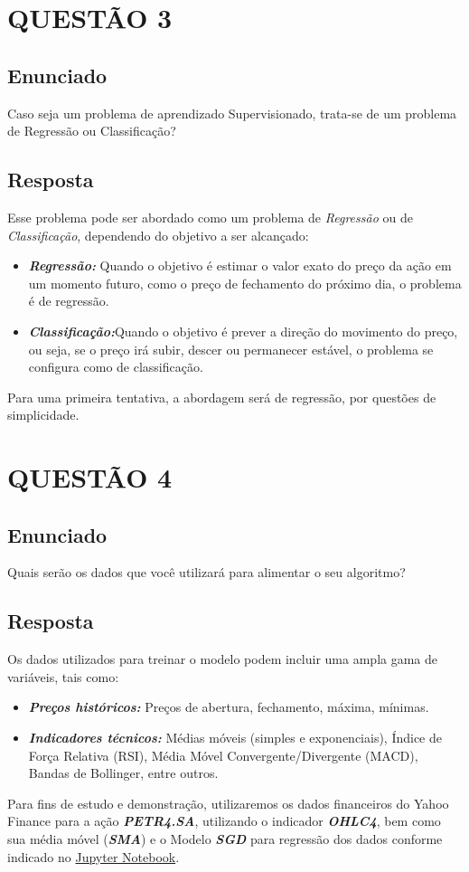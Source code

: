 \documentclass[a4paper, 12pt, onecolumn,singlespacing]{article}
\begin{document}
	\section{QUESTÃO 3}
	
	\subsection{Enunciado}
	Caso seja um problema de aprendizado Supervisionado, trata-se de um problema de Regressão ou Classificação?
	
	\subsection{Resposta}
		Esse problema pode ser abordado como um problema de \textit{Regressão} ou de \textit{Classificação}, dependendo do objetivo a ser alcançado:
		\begin{itemize}
			\item 	\textbf{\textit{Regressão:}} Quando o objetivo é estimar o valor exato do preço da ação em um momento futuro, como o preço de fechamento do próximo dia, o problema é de regressão.
			\item 	\textbf{\textit{Classificação:}}Quando o objetivo é prever a direção do movimento do preço, ou seja, se o preço irá subir, descer ou permanecer estável, o problema se configura como de classificação.
		\end{itemize}
		Para uma primeira tentativa, a abordagem será de regressão, por questões de simplicidade.
	\section{QUESTÃO 4}
	
	\subsection{Enunciado}
		Quais serão os dados que você utilizará para alimentar o seu algoritmo?
	
	\subsection{Resposta}
	
	Os dados utilizados para treinar o modelo podem incluir uma ampla gama de variáveis, tais como:
	\begin{itemize}
		\item \textbf{\textit{Preços históricos:}} Preços de abertura, fechamento, máxima, mínimas.
		\item \textbf{\textit{Indicadores técnicos:}} Médias móveis (simples e exponenciais), Índice de Força Relativa (RSI), Média Móvel Convergente/Divergente (MACD), Bandas de Bollinger, entre outros.
		
	\end{itemize}
	
	Para fins de estudo e demonstração, utilizaremos os dados financeiros do Yahoo Finance para a ação \textit{\textbf{PETR4.SA}}, utilizando o indicador \textbf{\textit{OHLC4}}, bem como sua média móvel (\textbf{\textit{SMA}}) e o Modelo \textit{\textbf{SGD}} para regressão dos dados conforme indicado no \href{file://Codigo_Problema_02_aula_02.ipynb}{Jupyter Notebook}.
	
		
\end{document}
